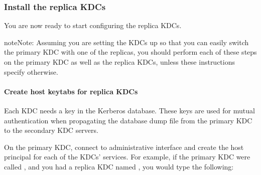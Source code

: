 \documentclass[letterpaper,10pt,english]{sphinxmanual}
\begin{document}
\begin{sphinxVerbatim}[commandchars=\\\{\}]
  
\end{sphinxVerbatim}


\subsubsection{Install the replica KDCs}
\label{\detokenize{admin/install_kdc:install-the-replica-kdcs}}
\sphinxAtStartPar
You are now ready to start configuring the replica KDCs.

\begin{sphinxadmonition}{note}{Note:}
\sphinxAtStartPar
Assuming you are setting the KDCs up so that you can easily
switch the primary KDC with one of the replicas, you should
perform each of these steps on the primary KDC as well as
the replica KDCs, unless these instructions specify
otherwise.
\end{sphinxadmonition}


\paragraph{Create host keytabs for replica KDCs}
\label{\detokenize{admin/install_kdc:create-host-keytabs-for-replica-kdcs}}\label{\detokenize{admin/install_kdc:replica-host-key}}
\sphinxAtStartPar
Each KDC needs a  key in the Kerberos database.  These keys
are used for mutual authentication when propagating the database dump
file from the primary KDC to the secondary KDC servers.

\sphinxAtStartPar
On the primary KDC, connect to administrative interface and create the
host principal for each of the KDCs’  services.  For example,
if the primary KDC were called , and you had a
replica KDC named , you would type the
following:
\end{document}
